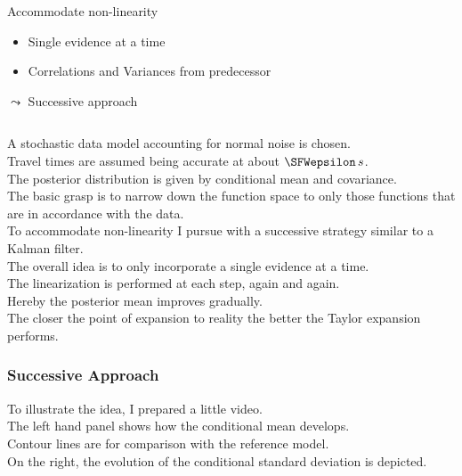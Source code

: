 \documentclass[aspectratio=169, t, 10pt,
    ignorenonframetext,
    ]{beamer}
\begin{document}
\begin{frame}
\begin{columns}
    \begin{alertblock}{Accommodate non-linearity}
        \begin{itemize}
            \item Single evidence at a time
            \item Correlations and Variances from predecessor
        \end{itemize}
        \hfill {\Large $\leadsto$} Successive approach ~
    \end{alertblock}

\end{columns}

\end{frame}

A stochastic data model accounting for normal noise is chosen.
\\
Travel times are assumed being accurate at about $\SFWepsilon\,s$.
\\[2mm]

The posterior distribution is given by conditional mean and covariance.
\\
The basic grasp is to narrow down the function space to only those functions that are in accordance with the data.
\\[2mm]

To accommodate non-linearity I pursue with a successive strategy similar to a Kalman filter.
\\
The overall idea is to only incorporate a single evidence at a time.
\\
The linearization is performed at each step, again and again.
\\
Hereby the posterior mean improves gradually.
\\
The closer the point of expansion to reality the better the Taylor expansion performs.
\\[2mm]

\begin{frame}
    \frametitle{Successive Approach}
    \begin{center}
    \end{center}
\end{frame}

To illustrate the idea, I prepared a little video.
\\
The left hand panel shows how the conditional mean develops.
\\
Contour lines are for comparison with the reference model.
\\
On the right, the evolution of the conditional standard deviation is depicted.
\\[2mm]
\end{document}
